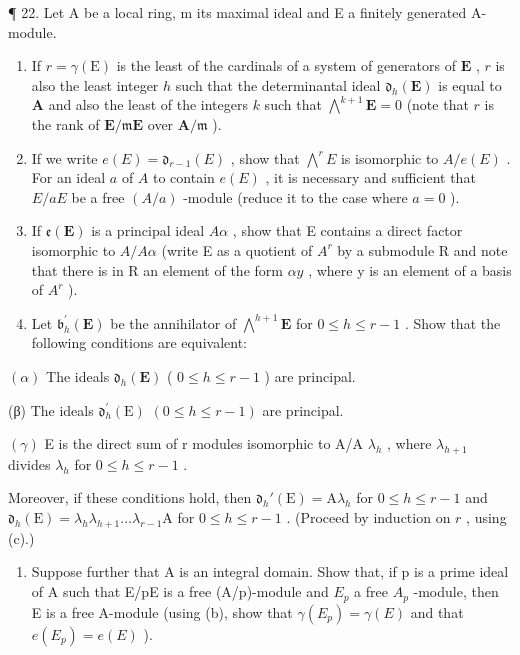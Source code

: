¶ 22. Let A be a local ring, m its maximal ideal and E a finitely generated A-module.

\begin{enumerate}
\def\labelenumi{(\alph{enumi})}
\item
  If \(r = \gamma(\mathrm{E})\) is the least of the cardinals of a system of generators of \(\mathbf{E}\) , \(r\) is also the least integer \(h\) such that the determinantal ideal \(\mathfrak{d}_h(\mathbf{E})\) is equal to \(\mathbf{A}\) and also the least of the integers \(k\) such that \(\bigwedge^{k+1} \mathbf{E} = 0\) (note that \(r\) is the rank of \(\mathbf{E}/\mathfrak{m}\mathbf{E}\) over \(\mathbf{A}/\mathfrak{m}\) ).
\item
  If we write \(e(E) = \mathfrak{d}_{r-1}(E)\) , show that \(\bigwedge^{r} E\) is isomorphic to \(A / e(E)\) . For an ideal \(a\) of \(A\) to contain \(e(E)\) , it is necessary and sufficient that \(E / aE\) be a free \((A / a)\) -module (reduce it to the case where \(a = 0\) ).
\item
  If \(\mathfrak{e}(\mathbf{E})\) is a principal ideal \(A\alpha\) , show that E contains a direct factor isomorphic to \(A/A\alpha\) (write E as a quotient of \(A^{r}\) by a submodule R and note that there is in R an element of the form \(\alpha y\) , where y is an element of a basis of \(A^{r}\) ).
\item
  Let \(\mathfrak{b}_h^{\prime}(\mathbf{E})\) be the annihilator of \(\bigwedge^{h+1}\mathbf{E}\) for \(0 \leqslant h \leqslant r - 1\) . Show that the following conditions are equivalent:
\end{enumerate}

\((\alpha)\) The ideals \(\mathfrak{d}_h(\mathbf{E})\) ( \(0 \leqslant h \leqslant r - 1\) ) are principal.

(β) The ideals \(\mathfrak{d}_h^\prime (\mathrm{E})\) \((0\leqslant h\leqslant r - 1)\) are principal.

\((\gamma)\) E is the direct sum of r modules isomorphic to A/A \(\lambda_{h}\) , where \(\lambda_{h+1}\) divides \(\lambda_{h}\) for \(0 \leqslant h \leqslant r - 1\) .

Moreover, if these conditions hold, then \(\mathfrak{d}_h'(\mathrm{E}) = \mathrm{A}\lambda_h\) for \(0 \leqslant h \leqslant r - 1\) and \(\mathfrak{d}_h(\mathrm{E}) = \lambda_h\lambda_{h+1} \ldots \lambda_{r-1}\mathrm{A}\) for \(0 \leqslant h \leqslant r - 1\) . (Proceed by induction on \(r\) , using (c).)

\begin{enumerate}
\def\labelenumi{(\alph{enumi})}
\setcounter{enumi}{4}
\tightlist
\item
  Suppose further that A is an integral domain. Show that, if p is a prime ideal of A such that E/pE is a free (A/p)-module and \(E_{p}\) a free \(A_{p}\) -module, then E is a free A-module (using (b), show that \(\gamma(E_{p}) = \gamma(E)\) and that \(e(E_{p}) = e(E)\) ).
\end{enumerate}

